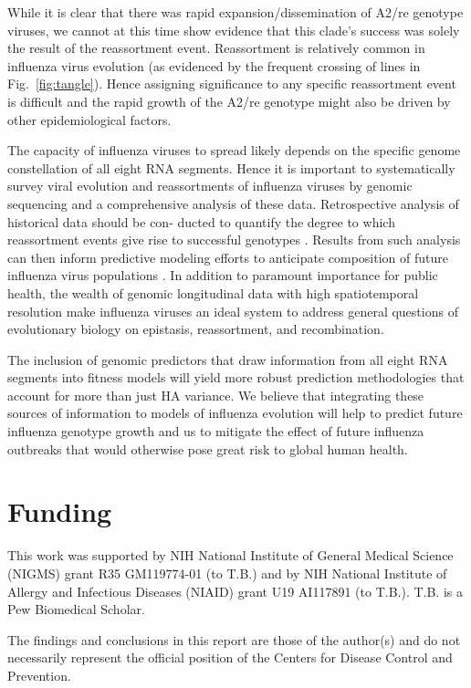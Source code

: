 While it is clear that there was rapid expansion/dissemination of A2/re genotype viruses, we cannot at this time show evidence that this clade’s success was solely the result of the reassortment event.
Reassortment is relatively common in influenza virus evolution (as evidenced by the frequent crossing of lines in Fig.~\ref{fig:tangle}).
Hence assigning significance to any specific reassortment event is difficult and the rapid growth of the A2/re genotype might also be driven by other epidemiological factors.

The capacity of influenza viruses to spread likely depends on the specific genome constellation of all eight RNA segments.
Hence it is important to systematically survey viral evolution and reassortments of influenza viruses by genomic sequencing and a comprehensive analysis of these data.
Retrospective analysis of historical data should be con- ducted to quantify the degree to which reassortment events give rise to successful genotypes \citep{nelson_multiple_2008, dudas_reassortment_2015, villa_fitness_2017}.
Results from such analysis can then inform predictive modeling efforts to anticipate composition of future influenza virus populations \citep{luksza_predictive_2014, neher_predicting_2014, morris_predictive_2017, klingen_silico_2018}.
In addition to paramount importance for public health, the wealth of genomic longitudinal data with high spatiotemporal resolution make influenza viruses an ideal system to address general questions of evolutionary biology on epistasis, reassortment, and recombination.

The inclusion of genomic predictors that draw information from all eight RNA segments into fitness models will yield more robust prediction methodologies that account for more than just HA variance.
We believe that integrating these sources of information to models of influenza evolution will help to predict future influenza genotype growth and us to mitigate the effect of future influenza outbreaks that would otherwise pose great risk to global human health.

\section*{Funding}
This work was supported by NIH National Institute of General Medical Science (NIGMS) grant R35 GM119774-01 (to T.B.) and by NIH National Institute of Allergy and Infectious Diseases (NIAID) grant U19 AI117891 (to T.B.). T.B. is a Pew Biomedical Scholar.

The findings and conclusions in this report are those of the author(s) and do not necessarily represent the official position of the Centers for Disease Control and Prevention.

